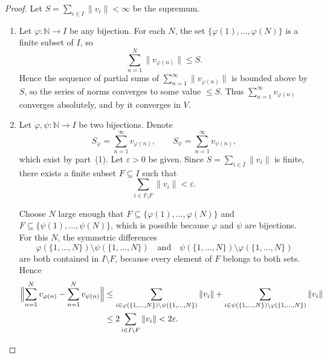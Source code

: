 \begin{proof}
    Let $S = \sum_{i\in I} \|v_i\| < \infty$ be the supremum.

    \begin{enumerate}
        \item Let $\varphi : \mathbb{N} \to I$ be any bijection. For each $N$, the set $\{\varphi(1),\dots,\varphi(N)\}$ is a finite subset of $I$, so
        $$\sum_{n=1}^N \|v_{\varphi(n)}\| \leq S.$$
        Hence the sequence of partial sums of $\sum_{n=1}^\infty \|v_{\varphi(n)}\|$ is bounded above by $S$, so the series of norms converges to some value $\leq S$. Thus $\sum_{n=1}^\infty v_{\varphi(n)}$ converges absolutely, and by  it converges in $V$.

        \item Let $\varphi, \psi : \mathbb{N} \to I$ be two bijections. Denote
        $$S_\varphi = \sum_{n=1}^\infty v_{\varphi(n)}, \qquad S_\psi = \sum_{n=1}^\infty v_{\psi(n)},$$
        which exist by part~(1). Let $\varepsilon > 0$ be given. Since $S = \sum_{i\in I} \|v_i\|$ is finite, there exists a finite subset $F \subseteq I$ such that
        $$\sum_{i\in I\setminus F} \|v_i\| < \varepsilon.$$

        Choose $N$ large enough that $F \subseteq \{\varphi(1),\dots,\varphi(N)\}$ and $F \subseteq \{\psi(1),\dots,\psi(N)\}$, which is possible because $\varphi$ and $\psi$ are bijections. For this $N$, the symmetric differences
        $$\varphi(\{1,\dots,N\}) \setminus \psi(\{1,\dots,N\}) \quad\text{and}\quad \psi(\{1,\dots,N\}) \setminus \varphi(\{1,\dots,N\})$$
        are both contained in $I \setminus F$, because every element of $F$ belongs to both sets. Hence
        \begin{align*}
        \Bigl\|\sum_{n=1}^N v_{\varphi(n)} - \sum_{n=1}^N v_{\psi(n)}\Bigr\|
        &\leq \sum_{i\in \varphi(\{1,\dots,N\})\setminus\psi(\{1,\dots,N\})} \|v_i\|
          + \sum_{i\in \psi(\{1,\dots,N\})\setminus\varphi(\{1,\dots,N\})} \|v_i\| \\
        &\leq 2\sum_{i\in I\setminus F} \|v_i\| < 2\varepsilon.
        \end{align*}


\end{enumerate}
\end{proof}
